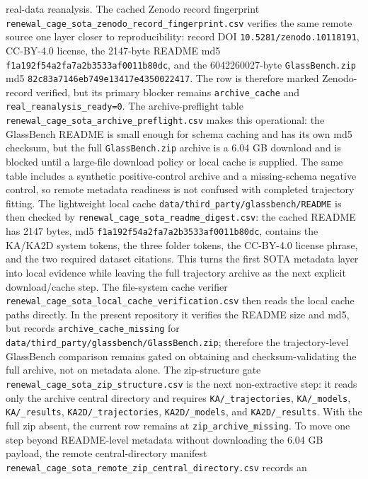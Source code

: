 \documentclass[aps,preprint,onecolumn,superscriptaddress,nofootinbib]{revtex4-2}
\begin{document}
real-data reanalysis.
The cached Zenodo record fingerprint
\texttt{renewal\_cage\_sota\_zenodo\_record\_fingerprint.csv} verifies the same
remote source one layer closer to reproducibility: record DOI
\texttt{10.5281/zenodo.10118191}, CC-BY-4.0 license, the 2147-byte README md5
\texttt{f1a192f54a2fa7a2b3533af0011b80dc}, and the 6042260027-byte
\texttt{GlassBench.zip} md5
\texttt{82c83a7146eb749e13417e4350022417}. The row is therefore marked
Zenodo-record verified, but its primary blocker remains \texttt{archive\_cache}
and \texttt{real\_reanalysis\_ready=0}.
The archive-preflight table
\texttt{renewal\_cage\_sota\_archive\_preflight.csv} makes this operational:
the GlassBench README is small enough for schema caching and has its own md5
checksum, but the full \texttt{GlassBench.zip} archive is a 6.04 GB download
and is blocked until a large-file download policy or local cache is supplied.
The same table includes a synthetic positive-control archive and a
missing-schema negative control, so remote metadata readiness is not confused
with completed trajectory fitting.
The lightweight local cache
\texttt{data/third\_party/glassbench/README} is then checked by
\texttt{renewal\_cage\_sota\_readme\_digest.csv}: the cached README has 2147
bytes, md5 \texttt{f1a192f54a2fa7a2b3533af0011b80dc}, contains the KA/KA2D
system tokens, the three folder tokens, the CC-BY-4.0 license phrase, and the
two required dataset citations. This turns the first SOTA metadata layer into
local evidence while leaving the full trajectory archive as the next explicit
download/cache step.
The file-system cache verifier
\texttt{renewal\_cage\_sota\_local\_cache\_verification.csv} then reads the
local cache paths directly. In the present repository it verifies the README
size and md5, but records \texttt{archive\_cache\_missing} for
\texttt{data/third\_party/glassbench/GlassBench.zip}; therefore the
trajectory-level GlassBench comparison remains gated on obtaining and
checksum-validating the full archive, not on metadata alone.
The zip-structure gate
\texttt{renewal\_cage\_sota\_zip\_structure.csv} is the next non-extractive
step: it reads only the archive central directory and requires
\texttt{KA/\_trajectories}, \texttt{KA/\_models}, \texttt{KA/\_results},
\texttt{KA2D/\_trajectories}, \texttt{KA2D/\_models}, and
\texttt{KA2D/\_results}. With the full zip absent, the current row remains at
\texttt{zip\_archive\_missing}.
To move one step beyond README-level metadata without downloading the 6.04 GB
payload, the remote central-directory manifest
\texttt{renewal\_cage\_sota\_remote\_zip\_central\_directory.csv} records an
\end{document}
